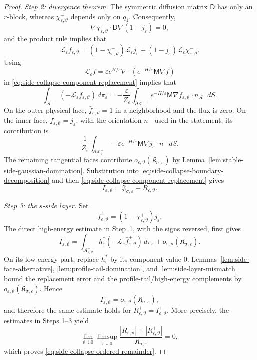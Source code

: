 \documentclass[11pt]{article}
\numberwithin{equation}{section}
\theoremstyle{plain}
\theoremstyle{definition}
\theoremstyle{remark}
\newcommand{\eps}{\varepsilon}
\newcommand{\calL}{\mathcal L}
\begin{document}
\begin{proof}
\emph{Step 2: divergence theorem.}
The symmetric diffusion matrix $\mathsf D$ has only an $r$-block, whereas
$\chi_{\eps,\vartheta}^-$ depends only on $q_1$.  Consequently,
\[
\nabla\chi_{\eps,\vartheta}^-\cdot\mathsf D\nabla(1-j_\eps)=0,
\]
and the product rule implies that
\begin{equation}
\label{eq:side-collapse-generator-product}
\calL_\eps\bar f_{\eps,\vartheta}
=(1-\chi_{\eps,\vartheta}^-)\calL_\eps j_\eps
+(1-j_\eps)\calL_\eps\chi_{\eps,\vartheta}^-.
\end{equation}
Using
\[
\calL_\eps f
=\eps e^{H/\eps}
\nabla\cdot\left(e^{-H/\eps}\mathsf M\nabla f\right)
\]
in \eqref{eq:side-collapse-component-replacement} implies that
\begin{equation}
\label{eq:side-collapse-boundary-decomposition}
\int_{\mathcal A^-}(-\calL_\eps\bar f_{\eps,\vartheta})\,d\pi_\eps
=-\frac{\eps}{Z_\eps}
\int_{\partial\mathcal A^-}
e^{-H/\eps}\mathsf M\nabla\bar f_{\eps,\vartheta}
\cdot n_{\mathcal A^-}\,dS.
\end{equation}
On the outer physical face, $\bar f_{\eps,\vartheta}=1$ in a neighborhood and
the flux is zero.  On the inner face,
$\bar f_{\eps,\vartheta}=j_\eps$; with the orientation $n^-$ used in the
statement, its contribution is
\[
\frac1{Z_\eps}
\int_{\partial\mathcal K_\eps^-}
-\eps e^{-H/\eps}\mathsf M\nabla j_\eps\cdot n^-\,dS.
\]
The remaining tangential faces contribute
$o_{\eps,\vartheta}(\mathfrak K_{\sigma,\eps})$ by
Lemma~\ref{lem:stable-side-gaussian-domination}.  Substitution into
\eqref{eq:side-collapse-boundary-decomposition} and then
\eqref{eq:side-collapse-component-replacement} gives
\[
I_{\eps,\vartheta}^-
=\mathfrak J_{\sigma,\eps}^-+R_{\eps,\vartheta}^-.
\]

\emph{Step 3: the $s$-side layer.}
Set
\[
\bar f_{\eps,\vartheta}^+=(1-\chi_{\eps,\vartheta}^+)j_\eps.
\]
The direct high-energy estimate in Step~1, with the signs reversed, first
gives
\[
I_{\eps,\vartheta}^+
=\int_{\mathcal A_{\eps,\vartheta}^+}h_\eps^*
(-\calL_\eps\bar f_{\eps,\vartheta}^+)\,d\pi_\eps
+o_{\eps,\vartheta}(\mathfrak K_{\sigma,\eps}).
\]
On its low-energy part, replace $h_\eps^*$ by its component value $0$.
Lemmas~\ref{lem:side-face-alternative},
\ref{lem:profile-tail-domination}, and
\ref{lem:side-layer-mismatch} bound the replacement error and the
profile-tail/high-energy complements by
$o_{\eps,\vartheta}(\mathfrak K_{\sigma,\eps})$.  Hence
\[
I_{\eps,\vartheta}^+
=o_{\eps,\vartheta}(\mathfrak K_{\sigma,\eps}),
\]
and therefore the same estimate holds for
$R_{\eps,\vartheta}^+=I_{\eps,\vartheta}^+$.
More precisely, the estimates in Steps 1--3 yield
\[
\lim_{\vartheta\downarrow0}\limsup_{\eps\downarrow0}
\frac{|R_{\eps,\vartheta}^-|+|R_{\eps,\vartheta}^+|}
{\mathfrak K_{\sigma,\eps}}=0,
\]
which proves \eqref{eq:side-collapse-ordered-remainder}.
\end{proof}
\end{document}
